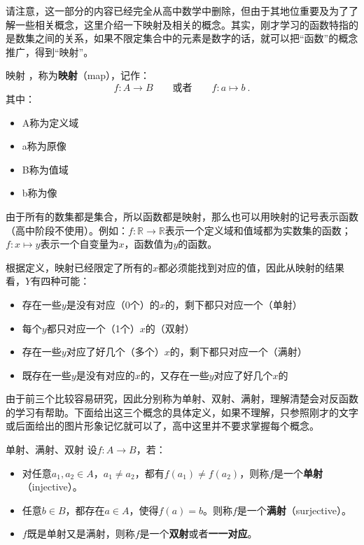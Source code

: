 请注意，这一部分的内容已经完全从高中数学中删除，但由于其地位重要及为了了解一些相关概念，这里介绍一下映射及相关的概念。其实，刚才学习的函数特指的是数集之间的关系，如果不限定集合中的元素是数字的话，就可以把“函数”的概念推广，得到“映射”。

\begin{definition}{映射}
，称为\textbf{映射}（map），记作：
\begin{equation}
f:A\to B\qquad\text{或者}\qquad f:a\mapsto b~.
\end{equation}
其中：
\begin{itemize}
\item A称为定义域\item a称为原像\item B称为值域\item b称为像
\end{itemize}
\end{definition}

由于所有的数集都是集合，所以函数都是映射，那么也可以用映射的记号表示函数（高中阶段不使用）。例如：$f: \mathbb R \to \mathbb R$表示一个定义域和值域都为实数集的函数；$f:x \mapsto y$表示一个自变量为$x$，函数值为$y$的函数。

根据定义，映射已经限定了所有的$x$都必须能找到对应的值，因此从映射的结果看，$Y$有四种可能：
\begin{itemize}
\item 存在一些$y$是没有对应（0个）的$x$的，剩下都只对应一个（单射）
\item 每个$y$都只对应一个（1个）$x$的（双射）
\item 存在一些$y$对应了好几个（多个）$x$的，剩下都只对应一个（满射）
\item 既存在一些$y$是没有对应的$x$的，又存在一些$y$对应了好几个$x$的
\end{itemize}

由于前三个比较容易研究，因此分别称为单射、双射、满射，理解清楚会对反函数的学习有帮助。下面给出这三个概念的具体定义，如果不理解，只参照刚才的文字或后面给出的图片形象记忆就可以了，高中这里并不要求掌握每个概念。

\begin{definition}{单射、满射、双射}
设$f:A\to{B}$，若：
\begin{itemize}
\item 对任意$a_1,a_2\in{A}$，$a_1\not={a_2}$，都有$f(a_1)\not={f(a_2)}$，则称$f$是一个\textbf{单射}（injective）。
\item 任意$b\in{B}$，都存在$a\in{A}$，使得$f(a)=b$。则称$f$是一个\textbf{满射}（surjective）。
\item $f$既是单射又是满射，则称$f$是一个\textbf{双射}或者\textbf{一一对应}。
\end{itemize}
\end{definition}

